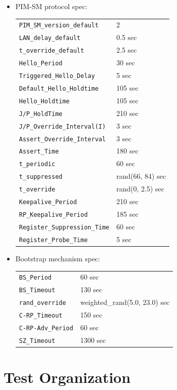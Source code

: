 \documentclass[11pt]{report}
\begin{document}
\begin{itemize}

\item PIM-SM protocol spec:

\begin{tabular}{ll}
\verb=PIM_SM_version_default=	& 2		\\	%
\verb=LAN_delay_default=	& 0.5 sec	\\
\verb=t_override_default=	& 2.5 sec	\\
\verb=Hello_Period=		& 30 sec	\\
\verb=Triggered_Hello_Delay=	& 5 sec		\\
\verb=Default_Hello_Holdtime=	& 105 sec	\\
\verb=Hello_Holdtime=		& 105 sec	\\
\verb=J/P_HoldTime=		& 210 sec	\\
\verb=J/P_Override_Interval(I)=	& 3 sec		\\
\verb=Assert_Override_Interval=	& 3 sec		\\
\verb=Assert_Time=		& 180 sec	\\
\verb=t_periodic=		& 60 sec	\\
\verb=t_suppressed=		& rand(66, 84) sec \\
\verb=t_override=		& rand(0, 2.5) sec \\
\verb=Keepalive_Period=		& 210 sec	\\
\verb=RP_Keepalive_Period=	& 185 sec	\\
\verb=Register_Suppression_Time= & 60 sec	\\
\verb=Register_Probe_Time=	& 5 sec
\end{tabular}

\item Bootstrap mechanism spec:

\begin{tabular}{ll}
\verb=BS_Period=		& 60 sec	\\
\verb=BS_Timeout=		& 130 sec	\\
\verb=rand_override=		& weighted\_rand(5.0, 23.0) sec \\
\verb=C-RP_Timeout=		& 150 sec	\\
\verb=C-RP-Adv_Period=		& 60 sec	\\
\verb=SZ_Timeout=		& 1300 sec
\end{tabular}

\end{itemize}

\section{Test Organization}
\end{document}

